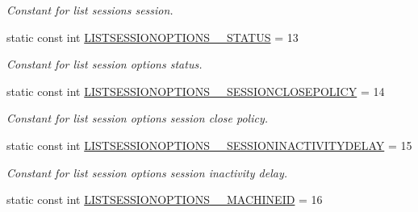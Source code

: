 \begin{DoxyCompactItemize}
\begin{DoxyCompactList}\small\item\em Constant for list sessions session. \item\end{DoxyCompactList}\item 
\hypertarget{classUMS__Data_1_1UMS__DataPackage_a7df99068a093a23a763eee990d488d46}{
static const int \hyperlink{classUMS__Data_1_1UMS__DataPackage_a7df99068a093a23a763eee990d488d46}{LISTSESSIONOPTIONS\_\-\_\-STATUS} = 13}
\label{classUMS__Data_1_1UMS__DataPackage_a7df99068a093a23a763eee990d488d46}

\begin{DoxyCompactList}\small\item\em Constant for list session options status. \item\end{DoxyCompactList}\item 
\hypertarget{classUMS__Data_1_1UMS__DataPackage_a528b75440742b72908bd7920ae50ef64}{
static const int \hyperlink{classUMS__Data_1_1UMS__DataPackage_a528b75440742b72908bd7920ae50ef64}{LISTSESSIONOPTIONS\_\-\_\-SESSIONCLOSEPOLICY} = 14}
\label{classUMS__Data_1_1UMS__DataPackage_a528b75440742b72908bd7920ae50ef64}

\begin{DoxyCompactList}\small\item\em Constant for list session options session close policy. \item\end{DoxyCompactList}\item 
\hypertarget{classUMS__Data_1_1UMS__DataPackage_abe32fab9db44996b77b2c45baa843ae6}{
static const int \hyperlink{classUMS__Data_1_1UMS__DataPackage_abe32fab9db44996b77b2c45baa843ae6}{LISTSESSIONOPTIONS\_\-\_\-SESSIONINACTIVITYDELAY} = 15}
\label{classUMS__Data_1_1UMS__DataPackage_abe32fab9db44996b77b2c45baa843ae6}

\begin{DoxyCompactList}\small\item\em Constant for list session options session inactivity delay. \item\end{DoxyCompactList}\item 
\hypertarget{classUMS__Data_1_1UMS__DataPackage_a4162ee3abb7fd4af0f65f2ed41cbc575}{
static const int \hyperlink{classUMS__Data_1_1UMS__DataPackage_a4162ee3abb7fd4af0f65f2ed41cbc575}{LISTSESSIONOPTIONS\_\-\_\-MACHINEID} = 16}
\label{classUMS__Data_1_1UMS__DataPackage_a4162ee3abb7fd4af0f65f2ed41cbc575}


\end{DoxyCompactItemize}
